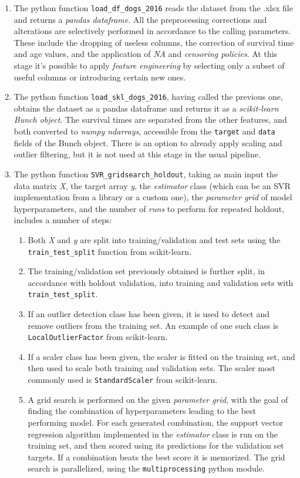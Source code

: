\documentclass[12pt]{report}
\begin{document}
\begin{enumerate}
\item The python function \texttt{load\_df\_dogs\_2016} reads the dataset from the .xlsx file and returns a \textit{pandas dataframe}. All the preprocessing corrections and alterations are selectively performed in accordance to the calling parameters. These include the dropping of useless columns, the correction of survival time and age values, and the application of \textit{NA} and \textit{censoring policies}. At this stage it's possible to apply \textit{feature engineering} by selecting only a subset of useful columns or introducing certain new ones.
\item The python function \texttt{load\_skl\_dogs\_2016}, having called the previous one, obtains the dataset as a pandas dataframe and returns it as a \textit{scikit-learn Bunch object}. The survival times are separated from the other features, and both converted to \textit{numpy ndarrays}, accessible from the \texttt{target} and \texttt{data} fields of the Bunch object. There is an option to already apply scaling and outlier filtering, but it is not used at this stage in the usual pipeline.
\item The python function \texttt{SVR\_gridsearch\_holdout}, taking as main input the data matrix \textit{X}, the target array \textit{y}, the \textit{estimator} class (which can be an SVR implementation from a library or a custom one), the \textit{parameter grid} of model hyperparameters, and the number of \textit{runs} to perform for repeated holdout, includes a number of steps:
\begin{enumerate}
\item Both \textit{X} and \textit{y} are split into training/validation and test sets using the \texttt{train\_test\_split} function from scikit-learn.
\item The training/validation set previously obtained is further split, in accordance with holdout validation, into training and validation sets with \texttt{train\_test\_split}.
\item If an outlier detection class has been given, it is used to detect and remove outliers from the training set. An example of one such class is \texttt{LocalOutlierFactor} from scikit-learn.
\item If a scaler class has been given, the scaler is fitted on the training set, and then used to scale both training and validation sets. The scaler most commonly used is \texttt{StandardScaler} from scikit-learn.
\item A grid search is performed on the given \textit{parameter grid}, with the goal of finding the combination of hyperparameters leading to the best performing model. For each generated combination, the support vector regression algorithm implemented in the \textit{estimator} class is run on the training set, and then scored using its predictions for the validation set targets. If a combination beats the best score it is memorized. The grid search is parallelized, using the \texttt{multiprocessing} python module.

\end{enumerate}
\end{enumerate}
\end{document}
